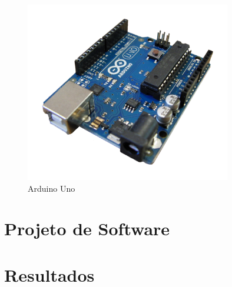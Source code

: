 \documentclass[12pt,a4paper]{report}
\begin{document}
\begin{figure}[p]
\includegraphics[width=0.8\textwidth]{arduino.png}
\caption{Arduino Uno}
\label{fig:arduino}
\end{figure}

\chapter{Projeto de Software}


\chapter{Resultados}

\end{document}
